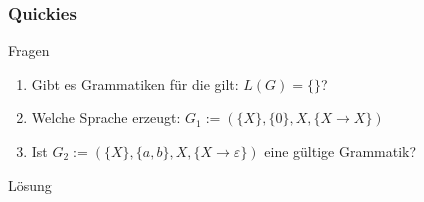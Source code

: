 \begin{frame}
    \frametitle{Quickies}
    \begin{exampleblock}{Fragen}
        \begin{enumerate}
          \item Gibt es Grammatiken für die gilt: $L(G) = \{\}$?\pause
          \item Welche Sprache erzeugt: $G_1 := (\{X\}, \{0\}, X, \{X \rightarrow X\})$\pause
          \item Ist $G_2 := (\{X\}, \{a, b\}, X, \{X \rightarrow \varepsilon\})$ eine gültige Grammatik?\pause
        \end{enumerate}
    \end{exampleblock}
    \begin{exampleblock}{Lösung}
        \begin{enumerate}
        \end{enumerate}
    \end{exampleblock}
\end{frame}

